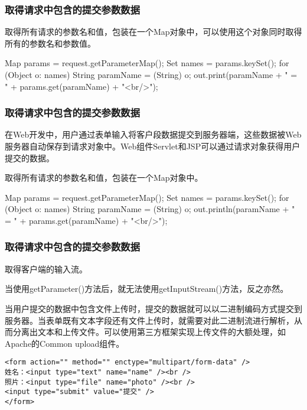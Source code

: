 \begin{frame}[fragile] %
\frametitle{取得请求中包含的提交参数数据} 

 取得所有请求的参数名和值，包装在一个Map对象中，可以使用这个对象同时取得所有的参数名和参数值。

\begin{javaCode}
Map params = request.getParameterMap();
Set names = params.keySet();
for (Object o: names) {
  String paramName = (String) o;
  out.print(paramName + " = " + params.get(paramName) + "<br/>");
}
\end{javaCode}
\end{frame}

\begin{frame}[fragile] %
\frametitle{取得请求中包含的提交参数数据} 

在Web开发中，用户通过表单输入将客户段数据提交到服务器端，这些数据被Web服务器自动保存到请求对象中。Web组件Servlet和JSP可以通过请求对象获得用户提交的数据。

 取得所有请求的参数名和值，包装在一个Map对象中。
\begin{javaCode}
Map params = request.getParameterMap();
Set names = params.keySet();
for (Object o: names) {
  String paramName = (String) o;
  out.println(paramName + " = " + params.get(paramName) + "<br/>");
}
\end{javaCode}
\end{frame}

\begin{frame} %
\frametitle{取得请求中包含的提交参数数据} 

 取得客户端的输入流。

当使用getParameter()方法后，就无法使用getInputStream()方法，反之亦然。

当用户提交的数据中包含文件上传时，提交的数据就可以以二进制编码方式提交到服务器。当表单既有文本字段还有文件上传时，就需要对此二进制流进行解析，从而分离出文本和上传文件。可以使用第三方框架实现上传文件的大额处理，如Apache的Common upload组件。

\begin{verbatim}
<form action="" method="" enctype="multipart/form-data" />
姓名：<input type="text" name="name" /><br />
照片：<input type="file" name="photo" /><br />
<input type="submit" value="提交" />
</form>
\end{verbatim}
\end{frame}

